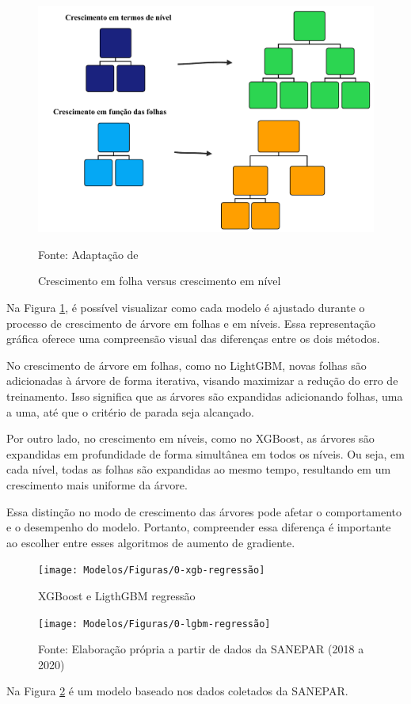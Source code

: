 \begin{figure}[H]
	\centering
	\caption{Crescimento em folha versus crescimento em nível}
	\label{fig:xgboost}
	\includegraphics[width=0.7\linewidth]{Modelos/Figuras/xgboost}
	
	Fonte: Adaptação de 
\end{figure}


Na Figura \ref{fig:xgboost}, é possível visualizar como cada modelo é ajustado durante o processo de crescimento de árvore em folhas e em níveis. Essa representação gráfica oferece uma compreensão visual das diferenças entre os dois métodos.

No crescimento de árvore em folhas, como no LightGBM, novas folhas são adicionadas à árvore de forma iterativa, visando maximizar a redução do erro de treinamento. Isso significa que as árvores são expandidas adicionando folhas, uma a uma, até que o critério de parada seja alcançado.

Por outro lado, no crescimento em níveis, como no XGBoost, as árvores são expandidas em profundidade de forma simultânea em todos os níveis. Ou seja, em cada nível, todas as folhas são expandidas ao mesmo tempo, resultando em um crescimento mais uniforme da árvore.

Essa distinção no modo de crescimento das árvores pode afetar o comportamento e o desempenho do modelo. Portanto, compreender essa diferença é importante ao escolher entre esses algoritmos de aumento de gradiente.

\begin{figure}[H]
	\centering
	\caption{XGBoost e LigthGBM regressão}\label{fig:1-xgb-regressao}
	\texttt{[image: Modelos/Figuras/0-xgb-regressão]}
	
\end{figure}

\begin{figure}[H]
	\centering
	\texttt{[image: Modelos/Figuras/0-lgbm-regressão]}	
	
	
	Fonte: Elaboração própria a partir de dados da SANEPAR (2018 a 2020)
	
\end{figure}

Na Figura \ref{fig:1-xgb-regressao} é um modelo baseado nos dados coletados da SANEPAR.

